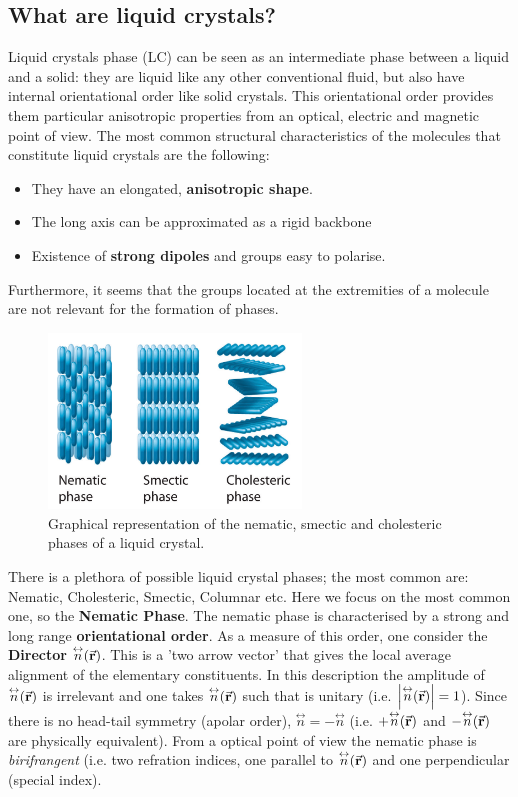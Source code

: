 \documentclass[../../Main/Main.tex]{subfiles}
\begin{document}
\subsection{What are liquid crystals?}
Liquid crystals phase (LC) can be seen as an intermediate phase between a liquid and a solid: they are liquid like any other conventional fluid, but also have internal orientational order like solid crystals. This orientational order provides them particular anisotropic properties from an optical, electric and magnetic point of view. The most common structural characteristics of the molecules that constitute liquid crystals are the following:
\begin{itemize}
\item They have an elongated, \textbf{anisotropic shape}.
\item The long axis can be approximated as a rigid backbone
\item Existence of \textbf{strong dipoles} and groups easy to polarise. 
\end{itemize}
Furthermore, it seems that the groups located at the extremities of a molecule are not relevant for the formation of phases.

 \begin{figure}[H]
 \centering
 \includegraphics[width=0.6\textwidth]{./img/LC.png}
 \caption{\label{fig:16_LC} Graphical representation of the nematic, smectic and cholesteric phases of a liquid crystal.}
 \end{figure}


\noindent There is a plethora of possible liquid crystal phases; the most common are: Nematic, Cholesteric, Smectic, Columnar etc. Here we focus on the most common one, so the \textbf{Nematic Phase}.
The nematic phase is characterised by a strong and long range \textbf{orientational order}. As a measure of this order, one consider the \textbf{Director} \( \overset{\leftrightarrow}{n} (\va{r}) \). This is a 'two arrow vector' that gives the local average alignment of the elementary constituents. In this description the amplitude of \( \overset{\leftrightarrow}{n} (\va{r}) \)    is irrelevant and one takes \( \overset{\leftrightarrow}{n} (\va{r}) \) such that is unitary (i.e. \( \abs{\overset{\leftrightarrow}{n} (\va{r})}  =1 \)).
 Since there is no head-tail symmetry (apolar order), \( \overset{\leftrightarrow}{n} = -  \overset{\leftrightarrow}{n}  \) (i.e.  \(+ \overset{\leftrightarrow}{n} (\va{r}) \) and \(- \overset{\leftrightarrow}{n} (\va{r}) \) are physically equivalent).
From a optical point of view the nematic phase is \textit{birifrangent} (i.e. two refration indices, one parallel to \( \overset{\leftrightarrow}{n} (\va{r}) \) and one perpendicular (special index).
\end{document}
